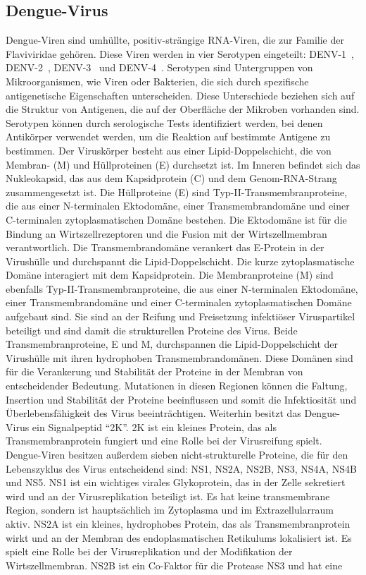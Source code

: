 \documentclass[german,version-2022-01]{uzl-thesis}
\begin{document}
\subsection{Dengue-Virus}
Dengue-Viren sind umh\"ullte, positiv-str\"angige RNA-Viren, die zur Familie der Flaviviridae geh\"oren. Diese Viren werden in vier Serotypen eingeteilt: DENV-1~\cite{tittarelli_dengue_2014}, DENV-2~\cite{cao_retrospective_2023}, DENV-3~\cite{peyrefitte_genetic_2003} und DENV-4~\cite{wardhani_genetic_2023}. Serotypen sind Untergruppen von Mikroorganismen, wie Viren oder Bakterien, die sich durch spezifische antigenetische Eigenschaften unterscheiden. Diese Unterschiede beziehen sich auf die Struktur von Antigenen, die auf der Oberfl\"ache der Mikroben vorhanden sind. Serotypen k\"onnen durch serologische Tests identifiziert werden, bei denen Antik\"orper verwendet werden, um die Reaktion auf bestimmte Antigene zu bestimmen. Der Virusk\"orper besteht aus einer Lipid-Doppelschicht, die von Membran- (M) und H\"ullproteinen (E) durchsetzt ist. Im Inneren befindet sich das Nukleokapsid, das aus dem Kapsidprotein (C) und dem Genom-RNA-Strang zusammengesetzt ist. Die H\"ullproteine (E) sind Typ-II-Transmembranproteine, die aus einer N-terminalen Ektodom\"ane, einer Transmembrandom\"ane und einer C-terminalen zytoplasmatischen Dom\"ane bestehen. Die Ektodom\"ane ist f\"ur die Bindung an Wirtszellrezeptoren und die Fusion mit der Wirtszellmembran verantwortlich. Die Transmembrandom\"ane verankert das E-Protein in der Virush\"ulle und durchspannt die Lipid-Doppelschicht. Die kurze zytoplasmatische Dom\"ane interagiert mit dem Kapsidprotein. Die Membranproteine (M) sind ebenfalls Typ-II-Transmembranproteine, die aus einer N-terminalen Ektodom\"ane, einer Transmembrandom\"ane und einer C-terminalen zytoplasmatischen Dom\"ane aufgebaut sind. Sie sind an der Reifung und Freisetzung infekti\"oser Viruspartikel beteiligt und sind damit die strukturellen Proteine des Virus. Beide Transmembranproteine, E und M, durchspannen die Lipid-Doppelschicht der Virush\"ulle mit ihren hydrophoben Transmembrandom\"anen. Diese Dom\"anen sind f\"ur die Verankerung und Stabilit\"at der Proteine in der Membran von entscheidender Bedeutung. Mutationen in diesen Regionen k\"onnen die Faltung, Insertion und Stabilit\"at der Proteine beeinflussen und somit die Infektiosit\"at und \"Uberlebensf\"ahigkeit des Virus beeintr\"achtigen. Weiterhin besitzt das Dengue-Virus ein Signalpeptid "`2K"'. 2K ist ein kleines Protein, das als Transmembranprotein fungiert und eine Rolle bei der Virusreifung spielt. Dengue-Viren besitzen au\ss{}erdem sieben nicht-strukturelle Proteine, die f\"ur den Lebenszyklus des Virus entscheidend sind: NS1, NS2A, NS2B, NS3, NS4A, NS4B und NS5. NS1 ist ein wichtiges virales Glykoprotein, das in der Zelle sekretiert wird und an der Virusreplikation beteiligt ist. Es hat keine transmembrane Region, sondern ist haupts\"achlich im Zytoplasma und im Extrazellularraum aktiv. NS2A ist ein kleines, hydrophobes Protein, das als Transmembranprotein wirkt und an der Membran des endoplasmatischen Retikulums lokalisiert ist. Es spielt eine Rolle bei der Virusreplikation und der Modifikation der Wirtszellmembran. NS2B ist ein Co-Faktor f\"ur die Protease NS3 und hat eine 
\end{document}
